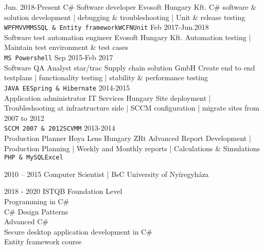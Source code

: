 \documentclass[9pt]{developercv}
\begin{document}
\begin{entrylist}
	\entry
		{Jun. 2018-Present}
		{C\# Software developer}
		{Evosoft Hungary Kft.}
		{{C\# software \& solution development | debugging \& troubleshooting | Unit \& release testing } \\ \texttt{WPF}\slashsep\texttt{MVVM}\slashsep\texttt{MSSQL \& Entity framework}\slashsep\texttt{WCF}\slashsep\texttt{NUnit}}
	\entry
		{Feb 2017-Jun.2018\\}
		{Software test automation engineer}
		{Evosoft Hungary Kft.}
		{{Automation testing | Maintain test environment \& test cases }
		\\ \texttt{MS Powershell}\slashsep {}}
	\entry
		{Sep 2015-Feb 2017\\}
		{Software QA Analyst}
		{star/trac Supply chain solution GmbH}
		{{Create end to end testplans | functionality testing | stability \& performance testing }
		\\ \texttt{JAVA EE}\slashsep\texttt{Spring \& Hibernate}}
	\entry
		{2014-2015\\}
		{Application administrator}
		{IT Services Hungary}
		{{Site deployment | Troubleshooting at infrastructure side | SCCM configuration | migrate sites from 2007 to 2012}
		\\ \texttt{SCCM 2007 \& 2012}\slashsep\texttt{SCVMM}}	
	\entry
		{2013-2014\\}
		{Production Planner}
		{Hoya Lens Hungary ZRt}
		{{Advanced Report Development | Production Planning | Weekly and Monthly reports | Calculations \& Simulations}
		\\ \texttt{PHP \& MySQL}\slashsep\texttt{Excel}}
		
\end{entrylist}



\begin{entrylist}
	\entry
		{2010 -- 2015}
		{Computer Scientist | BsC}
		{University of Nyíregyháza}
		
\end{entrylist}


\begin{entrylist}
	\entry
		{2018 - 2020}
		{ISTQB Foundation Level  \\  Programming in C\#  \\  C\# Design Patterns  \\  Advanced C\# \\ Secure desktop application development in C\# \\ Entity framework course  }
		

		
		
\end{entrylist}
\end{document}
